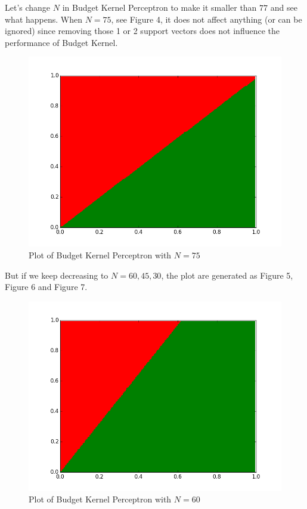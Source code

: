 \documentclass[submit]{harvardml}
\begin{document}
Let's change $N$ in Budget Kernel Perceptron to make it smaller than $77$ and see what happens. When $N=75$, see Figure 4, it does not affect anything (or can be ignored) since removing those 1 or 2 support vectors does not influence the performance of Budget Kernel. 

 \begin{figure}
     \centering
     \includegraphics[scale=0.3]{bk.png}
     \caption{Plot of Budget Kernel Perceptron with $N=75$}
 \end{figure}

But if we keep decreasing to $N=60, 45, 30$, the plot are generated as Figure 5, Figure 6 and Figure 7.

 \begin{figure}
     \centering
     \includegraphics[scale=0.3]{bk-N76.png}
     \caption{Plot of Budget Kernel Perceptron with $N=60$}
 \end{figure}
 
\end{document}
